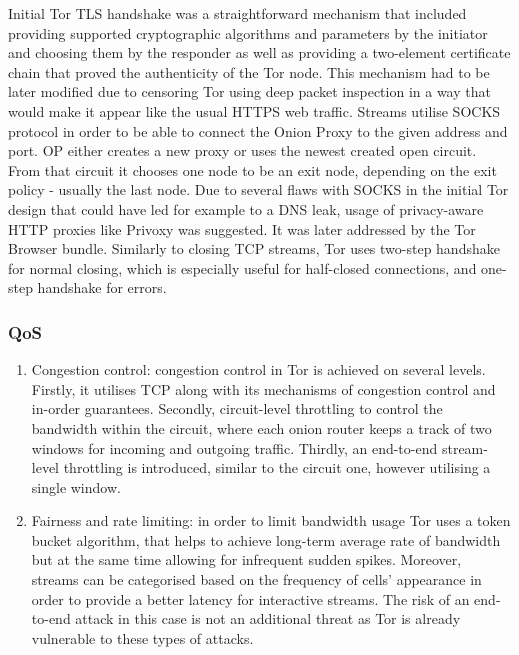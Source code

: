 Initial Tor TLS handshake was a straightforward mechanism that included providing supported cryptographic algorithms and parameters by the initiator and choosing them by the responder as well as providing a two-element certificate chain that proved the authenticity of the Tor node. This mechanism had to be later modified due to censoring Tor using deep packet inspection in a way that would make it appear like the usual HTTPS web traffic.
Streams utilise SOCKS protocol in order to be able to connect the Onion Proxy to the given address and port. OP either creates a new proxy or uses the newest created open circuit. From that circuit it chooses one node to be an exit node, depending on the exit policy - usually the last node.
Due to several flaws with SOCKS in the initial Tor design that could have led for example to a DNS leak, usage of privacy-aware HTTP proxies like Privoxy was suggested. It was later addressed by the Tor Browser bundle.
Similarly to closing TCP streams, Tor uses two-step handshake for normal closing, which is especially useful for half-closed connections, and one-step handshake for errors.

\subsubsection{QoS}
\begin{enumerate}
    \item Congestion control: congestion control in Tor is achieved on several levels. Firstly, it utilises TCP along with its mechanisms of congestion control and in-order guarantees. Secondly, circuit-level throttling to control the bandwidth within the circuit, where each onion router keeps a track of two windows for incoming and outgoing traffic. Thirdly, an end-to-end stream-level throttling is introduced, similar to the circuit one, however utilising a single window.
    \item Fairness and rate limiting: in order to limit bandwidth usage Tor uses a token bucket algorithm, that helps to achieve long-term average rate of bandwidth but at the same time allowing for infrequent sudden spikes.
    Moreover, streams can be categorised based on the frequency of cells' appearance in order to provide a better latency for interactive streams. The risk of an end-to-end attack in this case is not an additional threat as Tor is already vulnerable to these types of attacks.
\end{enumerate}


